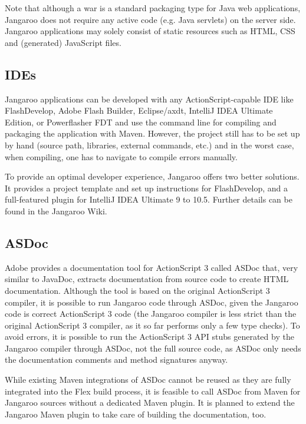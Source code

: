 \documentclass[10pt]{sigplanconf}
\begin{document}
Note that although a war is a standard packaging type for Java web applications, Jangaroo does not require any active code (e.g. Java servlets) on the server side. Jangaroo applications may solely consist of static resources such as HTML, CSS and (generated) JavaScript files.

\subsection{IDEs}

Jangaroo applications can be developed with any
Ac\-tion\-Script-capable IDE like FlashDevelop\citep{FlashDevelop},
Adobe Flash Builder\citep{flabui}, Eclipse/axdt\citep{axdt},
IntelliJ IDEA Ul\-ti\-mate Edi\-tion\citep{idea}, or
Powerflasher FDT\citep{fdt}
and use the command line for compiling and packaging the application with Maven. However, the project still has to be set up by hand (source path, libraries, external commands, etc.) and in the worst case, when compiling, one has to navigate to compile errors manually.

To provide an optimal developer experience, Jangaroo offers two better solutions. It provides a project template and set up instructions for FlashDevelop, and a full-featured plugin for IntelliJ IDEA Ultimate 9 to 10.5.
Further details can be found in the Jangaroo Wiki\citep{jwiki}.

\subsection{ASDoc}

Adobe provides a documentation tool for ActionScript 3 called ASDoc\citep{asdoc} that, very similar to JavaDoc, extracts documentation from source code to create HTML documentation. Although the tool is based on the original ActionScript 3 compiler, it is possible to run Jangaroo code through ASDoc, given the Jangaroo code is correct ActionScript 3 code (the Jangaroo compiler is less strict than the original ActionScript 3 compiler, as it so far performs only a few type checks). To avoid errors, it is possible to run the ActionScript 3 API stubs generated by the Jangaroo compiler through ASDoc, not the full source code, as ASDoc only needs the documentation comments and method signatures anyway.

While existing Maven integrations of ASDoc cannot be reused as they are fully integrated into the Flex build process, it is feasible to call ASDoc from Maven for Jangaroo sources without a dedicated Maven plugin. It is planned to extend the Jangaroo Maven plugin to take care of building the documentation, too.
\end{document}
